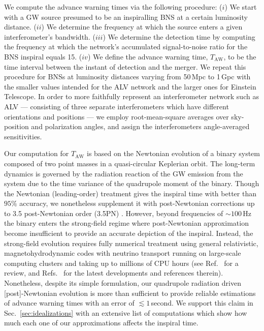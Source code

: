 \documentclass[prd,amsmath,amssymb,aps,floats,amsfonts,notitlepage,superscriptaddress,eqsecnum,nofootinbib,10pt]{revtex4-1}
\begin{document}
We compute the advance warning times via the following procedure: 
(${i}$) We start with a GW source presumed to be an inspiralling BNS at a certain luminosity distance. %
(${ii}$) We determine the frequency at which the source enters a given interferometer's bandwidth. 
(${iii}$) We determine the detection time by computing the frequency at which the network's accumulated signal-to-noise ratio for the BNS inspiral equals 15.
($iv$) We define the advance warning time, $T_\text{AW}$, to be the time interval between the instant of detection and the merger.
We repeat this procedure for BNSs at luminosity distances varying from 50\,Mpc to 1\,Gpc with the smaller values intended for the ALV network and 
the larger ones for Einstein Telescope.
In order to more faithfully represent an interferometer network such as ALV --- consisting of three separate interferometers which have different
orientations and positions --- we employ root-mean-square averages over sky-position and polarization angles,
and assign the interferometers angle-averaged sensitivities.

Our computation for $T_\text{AW}$ is based on the Newtonian evolution of a binary system composed of two point masses in a quasi-circular Keplerian orbit. 
The long-term dynamics is governed by the radiation reaction of 
the GW emission from the system due to the time variance of the quadrupole moment of the binary.
Though the Newtonian (leading-order) treatment gives the 
inspiral time with better than $ 95\%$ accuracy,
we nonetheless supplement it with post-Newtonian corrections up to 3.5 post-Newtonian order (3.5PN) \cite{Blanchet_LRR}.
However, beyond frequencies of $\sim 100\,$Hz the binary enters the strong-field regime where post-Newtonian
approximation become insufficient to provide an accurate depiction of the inspiral.
Instead, the strong-field evolution requires fully
numerical treatment using general relativistic, magnetohydrodynamic codes 
with neutrino transport running on large-scale computing clusters and taking up to millions of CPU hours 
(see Ref.~\cite{Shibata_book, Faber:2012rw} for a review, and Refs.~\cite{Baiotti:2016qnr,Kyutoku:2017voj, Zappa:2017xba, Dietrich:2018upm, Dietrich:2018phi} for the latest developments and references therein).
Nonetheless, despite its simple formulation, our quadrupole radiation driven [post]-Newtonian
evolution is more than sufficient to provide reliable estimations of advance warning times with an error of $\lesssim 1\,$second.
We support this claim in Sec.~\ref{sec:idealizations} with an extensive list of computations which show how much each one of our approximations affects the inspiral time.
\end{document}

